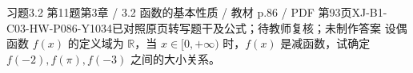 \par\noindent\begin{minipage}{\linewidth}
\begin{bankitem}{习题3.2 第11题}{第3章 / 3.2 函数的基本性质 / 教材 p.86 / PDF 第93页}{XJ-B1-C03-HW-P086-Y1034}{已对照原页转写题干及公式；待教师复核；未制作答案}
设偶函数 $f(x)$ 的定义域为 $\mathbb R$，当 $x\in[0,+\infty)$ 时，$f(x)$ 是减函数，试确定 $f(-2),f(\pi),f(-3)$ 之间的大小关系。
\end{bankitem}
\end{minipage}\par\medskip
